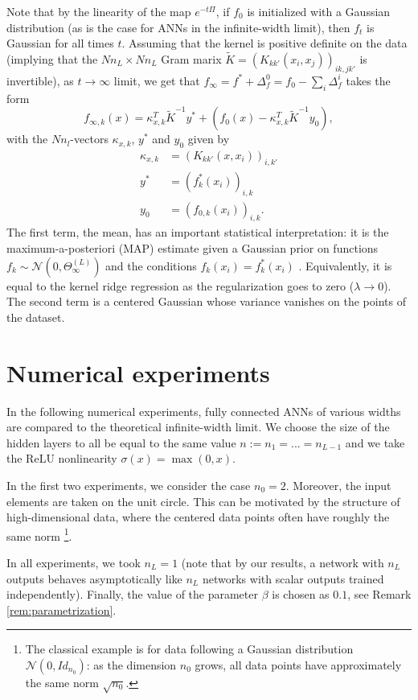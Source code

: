 \documentclass{article}
\begin{document}
Note that by the linearity of the map $e^{-t \Pi}$, if $f_0$ is initialized with a Gaussian distribution (as is the case for ANNs in the infinite-width limit), then $f_t$ is Gaussian for all times $t$. Assuming that the kernel is positive definite on the data (implying that the $Nn_L \times Nn_L$ Gram marix $\tilde{K}=\left(K_{kk'}(x_i, x_j) \right)_{ik, jk'}$ is invertible), as $t \to \infty$ limit, we get that $f_\infty = f^* + \Delta^0_f = f_0 - \sum_i \Delta^i_f$ takes the form
$$
 f_{\infty, k}(x) = \kappa_{x, k}^T \tilde{K}^{-1} y^* + \left(f_0(x) - \kappa_{x, k}^T \tilde{K}^{-1} y_0\right),
$$
with the $N n_l$-vectors $ \kappa_{x, k} $, $ y^* $ and $ y_0  $ given by
\begin{align*}
\kappa_{x, k} & = \left(K_{kk'}(x, x_i)\right)_{i, k'} \\
y^* & = \left(f^*_k(x_i)\right)_{i, k} \\
y_0 & = \left(f_{0, k}(x_i)\right)_{i, k}.
\end{align*}
The first term, the mean, has an important statistical interpretation: it is the maximum-a-posteriori (MAP) estimate given a Gaussian prior on functions $f_k\sim \mathcal{N}(0, \Theta^{(L)}_\infty)$  and the conditions $f_k(x_i)=f^*_k(x_i)$ . Equivalently, it is equal to the kernel ridge regression \cite{Shawe-Taylor} as the regularization goes to zero ($\lambda \to 0$). The second term is a centered Gaussian whose variance vanishes on the points of the dataset.

\section{Numerical experiments} \label{sec:numerical-experiments}
In the following numerical experiments, fully connected ANNs of various widths are compared to the theoretical infinite-width limit. We choose the size of the hidden layers to all be equal to the same value $n := n_1 = ... = n_{L-1}$ and we take the ReLU nonlinearity $\sigma(x)=\max(0,x)$. 

In the first two experiments, we consider the case $n_0=2$. Moreover, the input elements are taken on the unit circle. This can be motivated by the structure of high-dimensional data, where the centered data points often have roughly the same norm \footnote{The classical example is for data following a Gaussian distribution $\mathcal{N}(0, Id_{n_0})$: as the dimension $n_0$ grows, all data points have approximately the same norm $\sqrt{n_0}$.}.

In all experiments, we took $n_L = 1$ (note that by our results, a network with $n_L$ outputs behaves asymptotically like $n_L$ networks with scalar outputs trained independently). Finally, the value of the parameter $\beta$ is chosen as $0.1$, see Remark \ref{rem:parametrization}.
\end{document}
